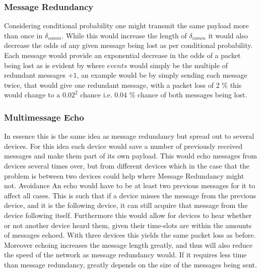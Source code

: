 \subsubsection*{Message Redundancy}\label{redundancy}
Considering conditional probability one might transmit the same payload more than once in $\delta_{comm}$.
While this would increase the length of $\delta_{comm}$ it would also decrease the odds of any given message being lost as per conditional probability.
Each message would provide an exponential decrease in the odds of a packet being lost as is evident by  where $events$ would simply be the multiple of redundant messages $+ 1$, an example would be by simply sending each message twice, that would give one redundant message, with a packet loss of 2 \% this would change to a $0.02^2$ chance i.e. 0.04 \% chance of both messages being lost.

\subsubsection*{Multimessage Echo}
In essence this is the same idea as message redundancy but spread out to several devices.
For this idea each device would save a number of previously received messages and make them part of its own payload.
This would echo messages from devices several times over, but from different devices which in the case that the problem is between two devices could help where Message Redundancy might not.       Avoidance
An echo would have to be at least two previous messages for it to affect all cases.
This is such that if a device misses the message from the previous device, and it is the following device, it can still acquire that message from the device following itself.
Furthermore this would allow for devices to hear whether or not another device heard them, given their time-slots are within the amounts of messages echoed.
With three devices this yields the same packet loss as before.
Moreover echoing increases the message length greatly, and thus will also reduce the speed of the network as message redundancy would.
If it requires less time than message redundancy, greatly depends on the size of the messages being sent.